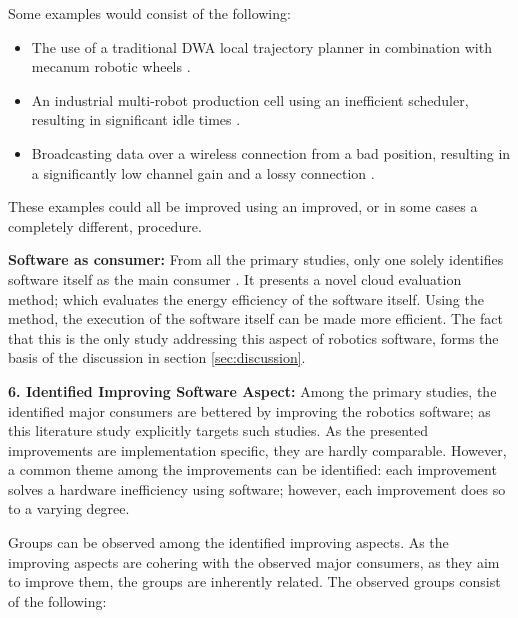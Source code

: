 Some examples would consist of the following:
\begin{itemize}
    \item The use of a traditional DWA local trajectory planner in combination with mecanum robotic wheels \cite{adascalitei2011mecanum_wheels}.
    \item An industrial multi-robot production cell using an inefficient scheduler, resulting in significant idle times \cite{wingstrom2013robot_cell_scheduling}.
    \item Broadcasting data over a wireless connection from a bad position, resulting in a significantly low channel gain and a lossy connection \cite{licea2013wireless_comms}.
\end{itemize}

These examples could all be improved using an improved, or in some cases a completely different, procedure.

\vspace{2mm} \noindent \textbf{Software as consumer:}
From all the primary studies, only one solely identifies software itself as the main consumer \cite{hou2017novel_cloud_evaluation_model}.
It presents a novel cloud evaluation method; which evaluates the energy efficiency of the software itself.
Using the method, the execution of the software itself can be made more efficient. 
The fact that this is the only study addressing this aspect of robotics software, forms the basis of the discussion in section \ref{sec:discussion}.

\vspace{2mm}

\noindent\textbf{6. Identified Improving Software Aspect:}
Among the primary studies, the identified major consumers are bettered by improving the robotics software;
as this literature study explicitly targets such studies.
As the presented improvements are implementation specific, they are hardly comparable.
However, a common theme among the improvements can be identified:
each improvement solves a hardware inefficiency using software; however, each improvement does so to a varying degree. 

Groups can be observed among the identified improving aspects.
As the improving aspects are cohering with the observed major consumers, as they aim to improve them,
the groups are inherently related.
The observed groups consist of the following:

